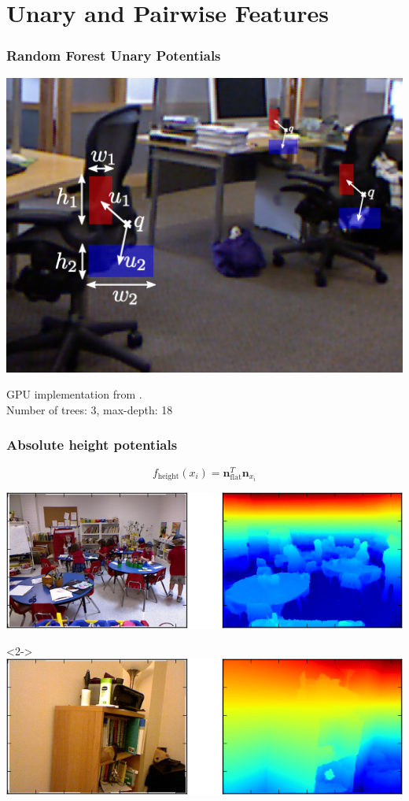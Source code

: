 \documentclass[final,ignorenonframetext,compress]{beamer}
\begin{document}
    \section{Unary and Pairwise Features}
    \begin{frame}
        \frametitle{Random Forest Unary Potentials}
        \begin{center}
            \includegraphics[width=.6\linewidth]{images/joerg_rf_features}
        \end{center}
        GPU implementation from \citet{stueckler2013}.\\
        Number of trees: 3, max-depth: 18
    \end{frame}

    \begin{frame}
        \frametitle{Absolute height potentials}
            \[
                f_{\text{height}}(x_i) = \textbf{n}_{\text{flat}}^T \textbf{n}_{x_i}
            \]
        \begin{center}
            \includegraphics[width=.6\linewidth]{images/height_success}\\
            \vspace{3mm}
            \begin{visibleenv}<2->
            \includegraphics[width=.6\linewidth]{images/height_failure}
            \end{visibleenv}
        \end{center}

    \end{frame}
\end{document}
